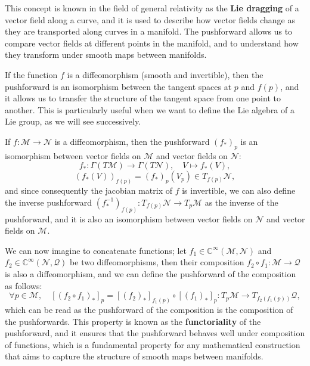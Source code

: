 This concept is known in the field of general relativity as the \textbf{Lie dragging} of a vector field along a curve, and it is used to describe how vector fields change as they are transported along curves in a manifold. The pushforward allows us to compare vector fields at different points in the manifold, and to understand how they transform under smooth maps between manifolds.

If the function \(f\) is a diffeomorphism (smooth and invertible), then the pushforward is an isomorphism between the tangent spaces at \(p\) and \(f(p)\), and it allows us to transfer the structure of the tangent space from one point to another. This is particularly useful when we want to define the Lie algebra of a Lie group, as we will see successively.

\begin{proposition}
    If \(f : \mathcal{M} \to \mathcal{N}\) is a diffeomorphism, then the pushforward \((f_*)_p\) is an isomorphism between vector fields on \(\mathcal{M}\) and vector fields on \(\mathcal{N}\):
    \[
        f_* : \Gamma(T\mathcal{M}) \to \Gamma(T\mathcal{N}), \quad V \mapsto f_*(V),
    \]
    \[
        (f_*(V))_{f(p)} = (f_*)_p(V_p) \in T_{f(p)} \mathcal{N},
    \]
    and since consequently the jacobian matrix of \(f\) is invertible, we can also define the inverse pushforward \((f^{-1}_*)_{f(p)} : T_{f(p)} \mathcal{N} \to T_p \mathcal{M}\) as the inverse of the pushforward, and it is also an isomorphism between vector fields on \(\mathcal{N}\) and vector fields on \(\mathcal{M}\).
\end{proposition}

We can now imagine to concatenate functions; let \(f_1 \in \mathbb{C}^{\infty}(\mathcal{M}, \mathcal{N})\) and \(f_2 \in \mathbb{C}^{\infty}(\mathcal{N}, \mathcal{Q})\) be two diffeomorphisms, then their composition \(f_2 \circ f_1 : \mathcal{M} \to \mathcal{Q}\) is also a diffeomorphism, and we can define the pushforward of the composition as follows:
\[
    \forall p \in \mathcal{M}, \quad [(f_2 \circ f_1)_*]_p = [(f_2)_*]_{f_1(p)} \circ [(f_1)_*]_p : T_p \mathcal{M} \to T_{f_2(f_1(p))} \mathcal{Q},
\]
which can be read as the pushforward of the composition is the composition of the pushforwards. This property is known as the \textbf{functoriality} of the pushforward, and it ensures that the pushforward behaves well under composition of functions, which is a fundamental property for any mathematical construction that aims to capture the structure of smooth maps between manifolds.

